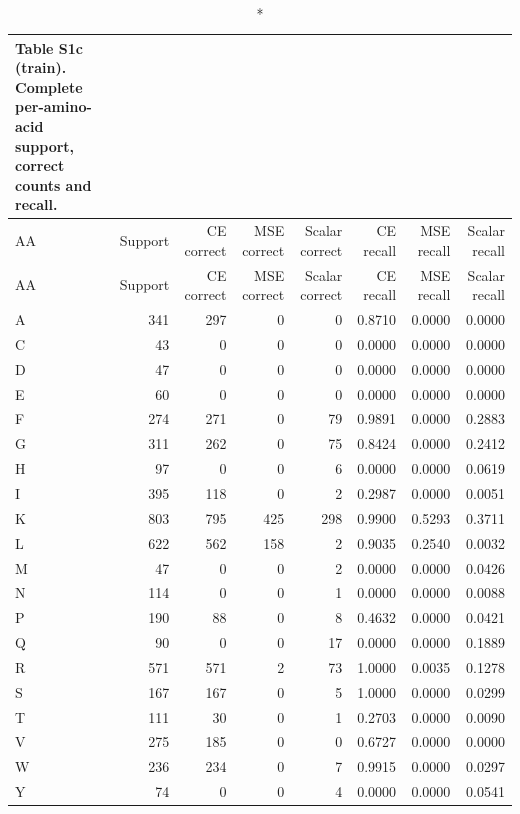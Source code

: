 \begin{longtable}{lrrrrrrr}
\caption*{\textbf{Table S1c (train).} Complete per-amino-acid support, correct counts and recall.}\\
\toprule
AA & Support & CE correct & MSE correct & Scalar correct & CE recall & MSE recall & Scalar recall \\
\midrule\endfirsthead
AA & Support & CE correct & MSE correct & Scalar correct & CE recall & MSE recall & Scalar recall \\
\midrule\endhead
A & 341 & 297 & 0 & 0 & 0.8710 & 0.0000 & 0.0000 \\
C & 43 & 0 & 0 & 0 & 0.0000 & 0.0000 & 0.0000 \\
D & 47 & 0 & 0 & 0 & 0.0000 & 0.0000 & 0.0000 \\
E & 60 & 0 & 0 & 0 & 0.0000 & 0.0000 & 0.0000 \\
F & 274 & 271 & 0 & 79 & 0.9891 & 0.0000 & 0.2883 \\
G & 311 & 262 & 0 & 75 & 0.8424 & 0.0000 & 0.2412 \\
H & 97 & 0 & 0 & 6 & 0.0000 & 0.0000 & 0.0619 \\
I & 395 & 118 & 0 & 2 & 0.2987 & 0.0000 & 0.0051 \\
K & 803 & 795 & 425 & 298 & 0.9900 & 0.5293 & 0.3711 \\
L & 622 & 562 & 158 & 2 & 0.9035 & 0.2540 & 0.0032 \\
M & 47 & 0 & 0 & 2 & 0.0000 & 0.0000 & 0.0426 \\
N & 114 & 0 & 0 & 1 & 0.0000 & 0.0000 & 0.0088 \\
P & 190 & 88 & 0 & 8 & 0.4632 & 0.0000 & 0.0421 \\
Q & 90 & 0 & 0 & 17 & 0.0000 & 0.0000 & 0.1889 \\
R & 571 & 571 & 2 & 73 & 1.0000 & 0.0035 & 0.1278 \\
S & 167 & 167 & 0 & 5 & 1.0000 & 0.0000 & 0.0299 \\
T & 111 & 30 & 0 & 1 & 0.2703 & 0.0000 & 0.0090 \\
V & 275 & 185 & 0 & 0 & 0.6727 & 0.0000 & 0.0000 \\
W & 236 & 234 & 0 & 7 & 0.9915 & 0.0000 & 0.0297 \\
Y & 74 & 0 & 0 & 4 & 0.0000 & 0.0000 & 0.0541 \\
\bottomrule\end{longtable}\endgroup
\begingroup\small\setlength{\tabcolsep}{4pt}\renewcommand{\arraystretch}{1.15}
